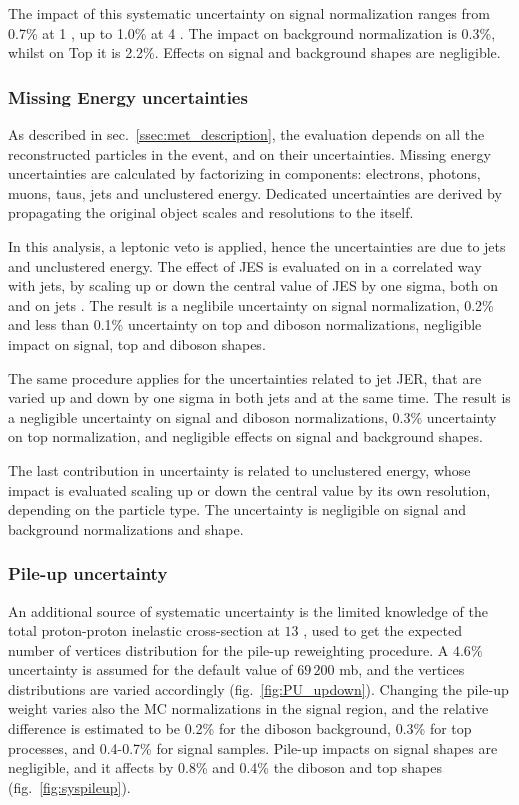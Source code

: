 \noindent The impact of this systematic uncertainty on signal normalization ranges from 0.7\% at 1 \TeV, up to 1.0\% at 4 \TeV. The impact on \VV background normalization is 0.3\%, whilst on Top it is 2.2\%. Effects on signal and background shapes are negligible.

\subsubsection{Missing Energy uncertainties}
\label{metuncsec}
As described in sec.~\ref{ssec:met_description}, the \MET evaluation depends on all the reconstructed particles in the event, and on their uncertainties. Missing energy uncertainties are calculated by factorizing \met in components: electrons, photons, muons, taus, jets and unclustered energy. Dedicated uncertainties are derived by propagating the original object scales and resolutions to the \MET itself.

\noindent In this analysis, a leptonic veto is applied, hence the \MET uncertainties are due to jets and unclustered energy. The effect of JES is evaluated on \MET in a correlated way with jets, by scaling up or down the central value of JES by one sigma, both on \MET and on jets \pt. The result is a neglibile uncertainty on signal normalization, 0.2\% and less than 0.1\% uncertainty on top and diboson normalizations, negligible impact on signal, top and diboson shapes.

\noindent The same procedure applies for the uncertainties related to jet JER, that are varied up and down by one sigma in both jets and \met at the same time. The result is a negligible uncertainty on signal and diboson normalizations, 0.3\% uncertainty on top normalization, and negligible effects on signal and background shapes.

\noindent The last contribution in \MET uncertainty is related to unclustered energy, whose impact is evaluated scaling up or down the central value by its own resolution, depending on the particle type. The uncertainty is negligible on signal and background normalizations and shape.

\subsubsection{Pile-up uncertainty}
An additional source of systematic uncertainty is the limited knowledge of the total proton-proton inelastic cross-section at $13$ \TeV, used to get the expected number of vertices distribution for the pile-up reweighting procedure. A $4.6\%$ uncertainty is assumed for the default value of $69\,200$ mb, and the vertices distributions are varied accordingly (fig.~\ref{fig:PU_updown}). Changing the pile-up weight varies also the MC normalizations in the signal region, and the relative difference is estimated to be 0.2\% for the diboson background, 0.3\% for top processes, and 0.4-0.7\% for signal samples. Pile-up impacts on signal shapes are negligible, and it affects by 0.8\% and 0.4\% the diboson and top shapes (fig.~\ref{fig:syspileup}). %

